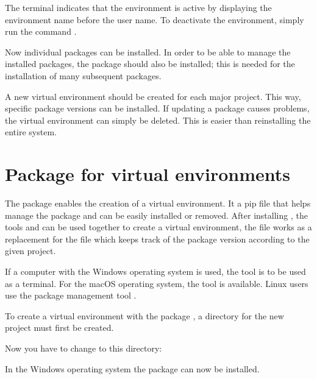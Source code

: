 The terminal indicates that the environment is active by displaying the environment name  before the user name. To deactivate the environment, simply run the command .

Now individual packages can be installed. In order to be able to manage the installed packages, the package  should also be installed; this is needed for the installation of many subsequent packages.

\medskip


\medskip


A new virtual environment should be created for each major project. This way, specific package versions can be installed. If updating a package causes problems, the virtual environment can simply be deleted. This is easier than reinstalling the entire system.


\section{Package  for virtual environments}

The package  enables the creation of a virtual environment. It a pip file that helps manage the package and can be easily installed or removed. After installing , the tools  and  can be used together to create a 
virtual environment, the file  works as a replacement for the file  which keeps track of the package version according to the given project.

If a computer with the Windows operating system is used, the tool  is to be used as a terminal. For the macOS operating system, the tool  is available. Linux users use the package management tool .

To create a virtual environment with the package , a directory for the new project  must first be created.

\medskip


\medskip

Now you have to change to this directory:

\medskip


\medskip

In the Windows operating system the package  can now be installed.

